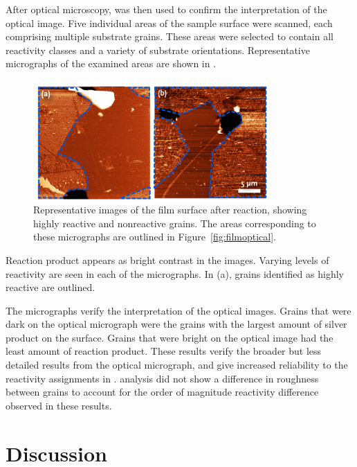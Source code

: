 After optical microscopy,  was then used to confirm the interpretation of the
optical image. Five individual areas of the sample surface were scanned, each comprising
multiple substrate grains. These areas were selected to contain all reactivity classes and
a variety of substrate orientations. Representative  micrographs of the examined
areas are shown in .
\begin{figure}
\centering
	\includegraphics[width=0.8\textwidth]{filmafm.pdf}
		\caption[Representative  images of film]{%
			Representative  images of the film surface after
			reaction, showing highly reactive and nonreactive grains. The 
			areas corresponding to these micrographs are outlined in 
			Figure~\ref{fig:filmoptical}. }
	\label{fig:filmafm}
\end{figure}
Reaction product appears as bright contrast in the  images. Varying levels of
reactivity are seen in each of the micrographs. In (a), grains
identified as highly reactive are outlined.

The  micrographs verify the interpretation of the optical images. Grains that
were dark on the optical micrograph were the grains with the largest amount of silver
product on the surface. Grains that were bright on the optical image had the least amount
of reaction product. These results verify the broader but less detailed results from the
optical micrograph, and give increased reliability to the reactivity assignments in
.  analysis did not show a difference in roughness
between grains to account for the order of magnitude reactivity difference observed in
these results.


\section{Discussion}
\label{sec:poly.reac.discussion}


